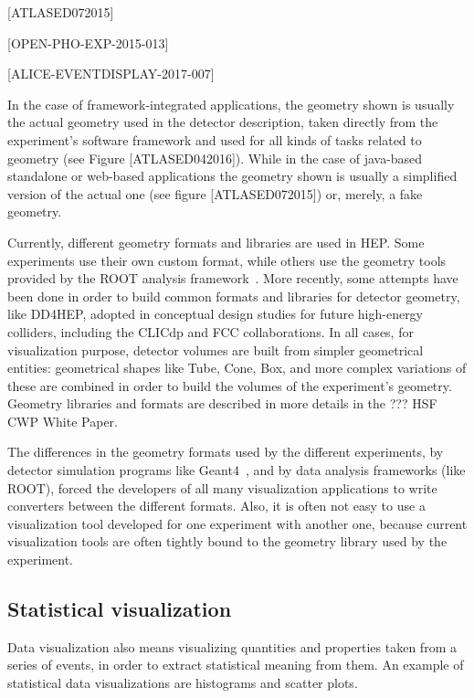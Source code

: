 \documentclass[12pt,a4paper]{article}
\begin{document}
[ATLASED072015]

[OPEN-PHO-EXP-2015-013]

[ALICE-EVENTDISPLAY-2017-007]

In the case of framework-integrated applications, the geometry shown is usually the actual geometry used in the detector description,
taken directly from the experiment’s software framework and used for all kinds of tasks related to geometry (see Figure [ATLASED042016]).
While in the case of  java-based standalone or web-based applications the geometry shown is usually a simplified version of the actual one
(see figure [ATLASED072015]) or, merely, a fake geometry.

Currently, different geometry formats and libraries are used in HEP. Some experiments use their own custom format,
while others use the geometry tools provided by the ROOT analysis framework~\cite{Root1997}. More recently, some attempts have been
done in order to build common formats and libraries for detector geometry, like DD4HEP,  adopted in conceptual design studies
for future high-energy colliders, including the CLICdp and FCC collaborations. In all cases, for visualization purpose, detector
volumes are built from simpler geometrical entities: geometrical shapes like Tube, Cone, Box, and more complex variations of these
are combined in order to build the volumes of the experiment’s geometry. Geometry libraries and formats are described in more details
in the ??? HSF CWP White Paper.

The differences in the geometry formats used by the different experiments, by detector simulation programs like Geant4~\cite{Geant4},
and by data analysis frameworks (like ROOT), forced the developers of all many visualization applications to write converters
between the different formats. Also, it is often not easy to use a visualization tool developed for one experiment with another one,
because current visualization tools are often tightly bound to the geometry library used by the experiment.

\hypertarget{statistical-visualization}{%
\subsection{Statistical visualization}\label{statistical-visualization}}

Data visualization also means visualizing quantities and properties taken from a series of events, in order to extract statistical
meaning from them. An example of statistical data visualizations are histograms and scatter plots.
\end{document}
